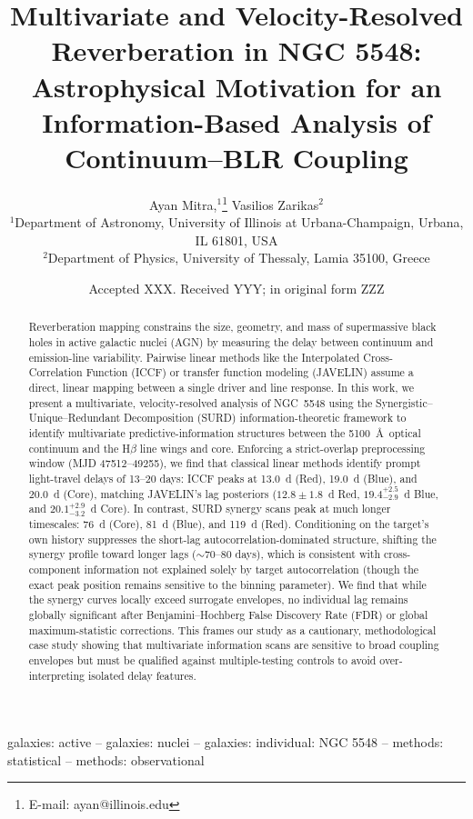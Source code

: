 \documentclass[fleqn,usenatbib]{mnras}
\title[SURD in NGC 5548]{Multivariate and Velocity-Resolved Reverberation in NGC 5548: Astrophysical Motivation for an Information-Based Analysis of Continuum--BLR Coupling}
\author[A. Mitra \& V. Zarikas]{
Ayan Mitra,$^{1}$\thanks{E-mail: ayan@illinois.edu}
Vasilios Zarikas$^{2}$
\\
$^{1}$Department of Astronomy, University of Illinois at Urbana-Champaign, Urbana, IL 61801, USA\\
$^{2}$Department of Physics, University of Thessaly, Lamia 35100, Greece
}
\date{Accepted XXX. Received YYY; in original form ZZZ}
\begin{document}
\label{firstpage}
\pagerange{\pageref{firstpage}--\pageref{lastpage}}
\maketitle

\begin{abstract}
Reverberation mapping constrains the size, geometry, and mass of supermassive black holes in active galactic nuclei (AGN) by measuring the delay between continuum and emission-line variability. Pairwise linear methods like the Interpolated Cross-Correlation Function (ICCF) or transfer function modeling (JAVELIN) assume a direct, linear mapping between a single driver and line response. In this work, we present a multivariate, velocity-resolved analysis of NGC~5548 using the Synergistic–Unique–Redundant Decomposition (SURD) information-theoretic framework to identify multivariate predictive-information structures between the 5100~\AA\ optical continuum and the H\(\beta\) line wings and core. Enforcing a strict-overlap preprocessing window (MJD 47512--49255), we find that classical linear methods identify prompt light-travel delays of 13--20 days: ICCF peaks at 13.0~d (Red), 19.0~d (Blue), and 20.0~d (Core), matching JAVELIN's lag posteriors ($12.8 \pm 1.8$~d Red, $19.4_{-2.9}^{+2.5}$~d Blue, and $20.1_{-3.2}^{+2.9}$~d Core). In contrast, SURD synergy scans peak at much longer timescales: 76~d (Core), 81~d (Blue), and 119~d (Red). Conditioning on the target's own history suppresses the short-lag autocorrelation-dominated structure, shifting the synergy profile toward longer lags ($\sim 70$--80 days), which is consistent with cross-component information not explained solely by target autocorrelation (though the exact peak position remains sensitive to the binning parameter). We find that while the synergy curves locally exceed surrogate envelopes, no individual lag remains globally significant after Benjamini–Hochberg False Discovery Rate (FDR) or global maximum-statistic corrections. This frames our study as a cautionary, methodological case study showing that multivariate information scans are sensitive to broad coupling envelopes but must be qualified against multiple-testing controls to avoid over-interpreting isolated delay features.
\end{abstract}
\begin{keywords}
galaxies: active -- galaxies: nuclei -- galaxies: individual: NGC 5548 -- methods: statistical -- methods: observational
\end{keywords}
\end{document}
